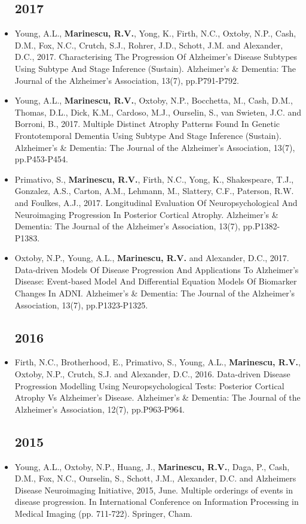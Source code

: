 \documentclass[a4paper,10pt]{article} %
\begin{document}
\begin{itemize}
\subsection*{2017}
\item[\poster] Young, A.L., \textbf{Marinescu, R.V.}, Yong, K., Firth, N.C., Oxtoby, N.P., Cash, D.M., Fox, N.C., Crutch, S.J., Rohrer, J.D., Schott, J.M. and Alexander, D.C., 2017. Characterising The Progression Of Alzheimer’s Disease Subtypes Using Subtype And Stage Inference (Sustain). Alzheimer's \& Dementia: The Journal of the Alzheimer's Association, 13(7), pp.P791-P792.
\item[\poster] Young, A.L., \textbf{Marinescu, R.V.}, Oxtoby, N.P., Bocchetta, M., Cash, D.M., Thomas, D.L., Dick, K.M., Cardoso, M.J., Ourselin, S., van Swieten, J.C. and Borroni, B., 2017. Multiple Distinct Atrophy Patterns Found In Genetic Frontotemporal Dementia Using Subtype And Stage Inference (Sustain). Alzheimer's \& Dementia: The Journal of the Alzheimer's Association, 13(7), pp.P453-P454.
\item[\poster] Primativo, S., \textbf{Marinescu, R.V.}, Firth, N.C., Yong, K., Shakespeare, T.J., Gonzalez, A.S., Carton, A.M., Lehmann, M., Slattery, C.F., Paterson, R.W. and Foulkes, A.J., 2017. Longitudinal Evaluation Of Neuropsychological And Neuroimaging Progression In Posterior Cortical Atrophy. Alzheimer's \& Dementia: The Journal of the Alzheimer's Association, 13(7), pp.P1382-P1383.
\item[\poster] Oxtoby, N.P., Young, A.L., \textbf{Marinescu, R.V.} and Alexander, D.C., 2017. Data-driven Models Of Disease Progression And Applications To Alzheimer’s Disease: Event-based Model And Differential Equation Models Of Biomarker Changes In ADNI. Alzheimer's \& Dementia: The Journal of the Alzheimer's Association, 13(7), pp.P1323-P1325.

\subsection*{2016}
\item[\poster] Firth, N.C., Brotherhood, E., Primativo, S., Young, A.L., \textbf{Marinescu, R.V.}, Oxtoby, N.P., Crutch, S.J. and Alexander, D.C., 2016. Data-driven Disease Progression Modelling Using Neuropsychological Tests: Posterior Cortical Atrophy Vs Alzheimer's Disease. Alzheimer's \& Dementia: The Journal of the Alzheimer's Association, 12(7), pp.P963-P964.

\subsection*{2015}
\item[\poster] Young, A.L., Oxtoby, N.P., Huang, J., \textbf{Marinescu, R.V.}, Daga, P., Cash, D.M., Fox, N.C., Ourselin, S., Schott, J.M., Alexander, D.C. and Alzheimers Disease Neuroimaging Initiative, 2015, June. Multiple orderings of events in disease progression. In International Conference on Information Processing in Medical Imaging (pp. 711-722). Springer, Cham.

\end{itemize}
\end{document}
